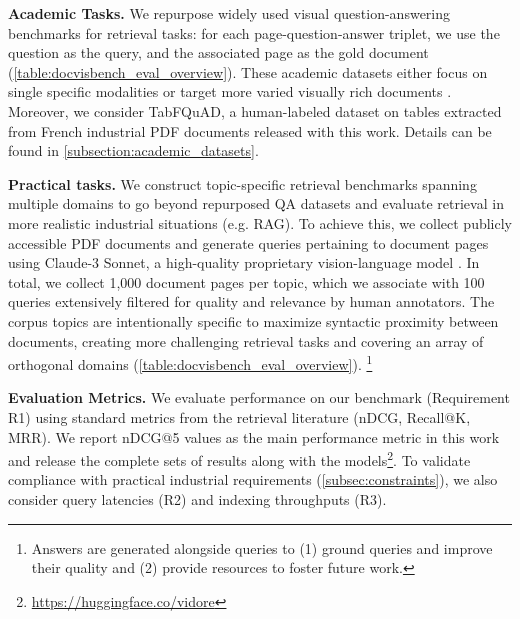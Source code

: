 \documentclass{article} %
\begin{document}
\noindent\textbf{Academic Tasks.}
We repurpose widely used visual question-answering benchmarks for retrieval tasks: for each page-question-answer triplet, we use the question as the query, and the associated page as the gold document (\autoref{table:docvisbench_eval_overview}). These academic datasets either focus on single specific modalities \citep{mathew_docvqa_2020, mathew_infographicvqa_2021, li2024multimodal} or target more varied visually rich documents \citep{zhu_towards_2022}. Moreover, we consider TabFQuAD, a human-labeled dataset on tables extracted from French industrial PDF documents released with this work. Details can be found in \autoref{subsection:academic_datasets}.


\label{paragraph:practical_tasks}
\noindent\textbf{Practical tasks.}
We construct topic-specific retrieval benchmarks spanning multiple domains to go beyond repurposed QA datasets and evaluate retrieval in more realistic industrial situations (e.g. RAG). To achieve this, we collect publicly accessible PDF documents and generate queries pertaining to document pages using Claude-3 Sonnet, a high-quality proprietary vision-language model \citep{anthropic_claude_2024}. In total, we collect 1,000 document pages per topic, which we associate with 100 queries extensively filtered for quality and relevance by human annotators. The corpus topics are intentionally specific to maximize syntactic proximity between documents, creating more challenging retrieval tasks and covering an array of orthogonal domains (\autoref{table:docvisbench_eval_overview}). 
\footnote{Answers are generated alongside queries to (1) ground queries and improve their quality and (2) provide resources to foster future work.}


\label{paragraph:evaluation_metrics}
\noindent\textbf{Evaluation Metrics.}
We evaluate performance on our benchmark (Requirement R1) using standard metrics from the retrieval literature (nDCG, Recall@K, MRR). We report nDCG@5 values as the main performance metric in this work and release the complete sets of results along with the models\footnote{\url{https://huggingface.co/vidore}}. To validate compliance with practical industrial requirements (\autoref{subsec:constraints}), we also consider query latencies (R2) and indexing throughputs (R3).


\end{document}
